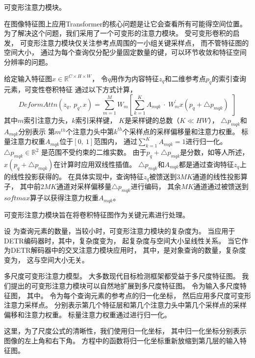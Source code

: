 可变形注意力模块。

在图像特征图上应用Transformer的核心问题是让它会查看所有可能得空间位置。
为了解决这个问题，我们采用了一个可变形的注意力模块。
受可变形卷积的启发，
可变形注意力模块仅关注参考点周围的一小组关键采样点，
而不管特征图的空间大小，
通过为每个查询仅分配少量固定数量的键，可以环节收敛和特征空间分辨率的问题。


给定输入特征图$x \in \mathbb{R}^{C\times H \times W}$，
令$q$用作为内容特征$z_{q}$和二维参考点$p_{q}$的索引查询元素，可变性卷积特征
通过以下方式计算，
% 
% 
% 
% 
\begin{equation}
	DeformAttn(z_{q},~p_{q},x)=
	\sum_{m=1}^{M}
	W_{m}\left [ 
	\sum_{k=1}^{K}A_{mqk}~\cdot~
	W_{m}^{'}x\left ( p_{q} + \bigtriangleup p_{mqk} \right ) 
	~~\right ]  
\end{equation}
% 
% 
% 
% 
其中$m$索引注意力头，$k$索引采样键，
$K$是采样键的总数（$K \ll HW$），
$\bigtriangleup p_{mqk} $和$A_{mqk}$分别表示
第$m^{th}$个注意力头中第$k^{th}$个采样点的采样偏移量和注意力权重。
标量注意力权重$A_{mqk}$位于$\left [ 0,~1 \right ] $范围内，
通过$ {\textstyle \sum_{k=1}^{K}} A_{mqk}=1$进行归一化。
$\bigtriangleup p_{mqk} \in \mathbb{R}^{2}$
是范围不受约束的二维实数。
由于$p_{q} + \bigtriangleup p_{mqk}$是分数，如等人所述，
$x\left ( p_{q} + \bigtriangleup p_{mqk} \right ) $在计算时应用双线性插值。
$\bigtriangleup p_{mqk}   $和$A_{mqk}$都是通过查询特征$z_{q}$上的线性投影获得的。
在具体实现中，查询特征$z_{q}$被馈送到$3MK$通道的线性投影算子，
其中前$2MK$通道对采样偏移量$\bigtriangleup p_{mqk}$进行编码，
其余$MK$通道通过被馈送到$softmax$算子以获得注意力权重$A_{mqk}$。





可变形注意力模块旨在将卷积特征图作为关键元素进行处理。

设 为查询元素的数量，当较小时，可变形注意力模块的复杂度为。
当应用于DETR编码器时，其中，复杂度变为，
起复杂度与空间大小呈线性关系。
当它作为DETR解码器中的交叉注意力模块应用时，
其中，是对象查询的数量，复杂度变为，
这与空间大小无关。


多尺度可变形注意力模型。
大多数现代目标检测框架都受益于多尺度特征图。
我们提出的可变形注意力模块可以自然地扩展到多尺度特征图。
令为输入多尺度特征图，
其中。
令为每个查询元素的参考点的归一化坐标，
然后应用多尺度可变形注意力采样点。
分别表示第几个特征层和第几个注意力头中第几个采样点的采样偏移和注意力权重。
标量注意力权重通过进行归一化。

这里，为了尺度公式的清晰性，我们使用归一化坐标，
其中归一化坐标分别表示图像的左上角和右下角。
方程中的函数将归一化坐标重新放缩到第几层的输入特征图。


